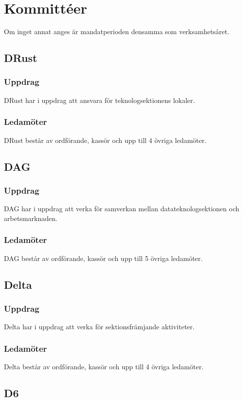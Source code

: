 \section{Kommittéer}

Om inget annat anges är mandatperioden densamma som verksamhetsåret.

\subsection{DRust}
\subsubsection{Uppdrag}
DRust har i uppdrag att ansvara för teknologsektionens lokaler.
\subsubsection{Ledamöter}
DRust består av ordförande, kassör och upp till 4 övriga ledamöter.

\subsection{DAG}
\subsubsection{Uppdrag}
DAG har i uppdrag att verka för samverkan mellan datateknologsektionen och arbetsmarknaden.
\subsubsection{Ledamöter}
DAG består av ordförande, kassör och upp till 5 övriga ledamöter.

\subsection{Delta}
\subsubsection{Uppdrag}
Delta har i uppdrag att verka för sektionsfrämjande aktiviteter.
\subsubsection{Ledamöter}
Delta består av ordförande, kassör och upp till 4 övriga ledamöter.

\subsection{D6}
